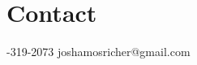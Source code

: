 \documentclass[11pt,a4paper]{moderncv}
\begin{document}
\nocite{mcp,dengue,usda,euro,notredame}



\closesection{}                   %
\renewcommand{\listitemsymbol}{-} %


\section{Contact}
-319-2073
\newline
joshamosricher@gmail.com
\end{document}
